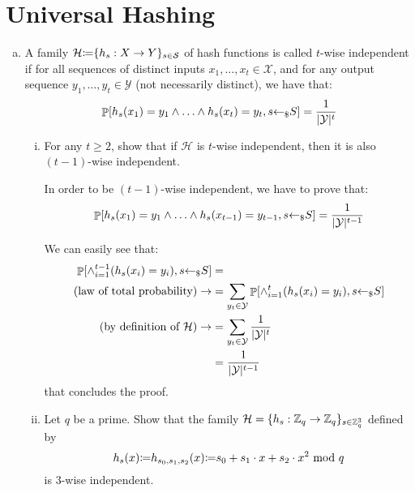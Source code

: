 \section{Universal Hashing}
\begin{enumerate}[(a)]
	\item A family $\mathcal{H} {\coloneqq} \{h_s: X \to Y\}_{s \in \mathcal{S}}$ of hash functions is called $t$-wise independent if for all sequences of distinct inputs $x_1, \dots, x_t \in \mathcal{X}$, and for any output sequence $y_1, \dots, y_t \in \mathcal{Y}$ (not necessarily distinct), we have that:
	\[ \P[h_s(x_1) = y_1 \and \dots \and h_s(x_t) = y_t, s \ud S] = \frac{1}{|\mathcal{Y}|^t} \]
	\begin{enumerate}[(i)]
		\item For any $t \ge 2$, show that if $\mathcal{H}$ is $t$-wise independent, then it is also $(t-1)$-wise independent.
		
		\begin{solution}
			In order to be $(t-1)$-wise independent, we have to prove that:
			\[ \P[h_s(x_1) = y_1 \and \dots \and h_s(x_{t-1}) = y_{t-1}, s \ud S] = \frac{1}{|\mathcal{Y}|^{t-1}} \]
			
			We can easily see that:
			\begin{align*}
				\mathop{\mathbb P}[\wedge_{i=1}^{t-1} (h_s(x_i) = y_i), s {\leftarrow_\$} S ] &= \\ 
				\mbox{(law of total probability)} \rightarrow &= \sum_{y_t \in \mathcal{Y}} \mathop{\mathbb P}[\wedge_{i=1}^{t} (h_s(x_i) = y_i), s {\leftarrow_\$} S] \\
				\mbox{(by definition of $\mathcal{H}$)} \rightarrow &= \sum_{y_t \in \mathcal{Y}} \frac{1}{|\mathcal{Y}|^t} \\
				&= \frac{1}{|\mathcal{Y}|^{t-1}}
			\end{align*}
			that concludes the proof.
		\end{solution}
	
		\item Let $q$ be a prime. Show that the family $\mathcal{H} = \{h_s:{\mathbb Z}_q \to {\mathbb Z}_q \}_{s \in {\mathbb Z}_q^3}$ defined by
		\[ h_s(x) {\coloneqq} h_{s_0,s_1,s_2}(x) {\coloneqq} s_0 + s_1 \cdot x + s_2 \cdot x^2 \mbox{ mod } q \]
		is 3-wise independent.
		

\end{enumerate}
\end{enumerate}
